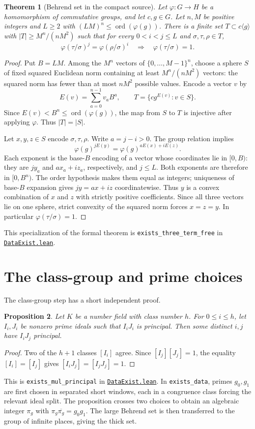 \documentclass[11pt,oneside,openany]{amsbook}
\newtheorem{theorem}{Theorem}[section]
\newtheorem{proposition}[theorem]{Proposition}
\theoremstyle{remark}
\numberwithin{equation}{section}
\newcommand{\ghroot}{https://github.com/lsernau/grh-lean/blob/}
\newcommand{\ghrev}{72fead102f663d5c7a407964a13dc0cf9d977207}
\newcommand{\leanfile}[2]{%
  \href{\ghroot\ghrev/grh-compact/src/#1}{\nolinkurl{#2}}}
\begin{document}
\begin{theorem}[Behrend set in the compact source]
\label{thm:behrend}
Let $\varphi:G\to H$ be a homomorphism of commutative
groups, and let $c,g\in G$. Let $n,M$ be positive
integers and $L\ge2$ with
$(LM)^n\le\operatorname{ord}(\varphi(g))$.
There is a finite set $T\subset c\langle g\rangle$ with
$|T|\ge M^n/(nM^2)$ such that for every
$0<i<j\le L$ and $\sigma,\tau,\rho\in T$,
\[
\varphi(\tau/\sigma)^j
 =\varphi(\rho/\sigma)^i
 \quad\Longrightarrow\quad
\varphi(\tau/\sigma)=1.
\]
\end{theorem}
\begin{proof}
Put $B=LM$. Among the $M^n$ vectors of
$\{0,\ldots,M-1\}^n$, choose a sphere $S$ of fixed
squared Euclidean norm containing at least
$M^n/(nM^2)$ vectors: the squared norm has fewer than
at most $nM^2$ possible values. Encode a vector $v$ by
\[
E(v)=\sum_{a=0}^{n-1}v_aB^a,
\qquad T=\{c g^{E(v)}:v\in S\}.
\]
Since $E(v)<B^n\le\operatorname{ord}(\varphi(g))$,
the map from $S$ to $T$ is injective after applying
$\varphi$. Thus $|T|=|S|$.

Let $x,y,z\in S$ encode $\sigma,\tau,\rho$.
Write $a=j-i>0$. The group relation implies
\[
\varphi(g)^{jE(y)}
 =\varphi(g)^{aE(x)+iE(z)}.
\]
Each exponent is the base-$B$ encoding of a vector
whose coordinates lie in $[0,B)$: they are $jy_a$ and
$ax_a+iz_a$, respectively, and $j\le L$. Both
exponents are therefore in $[0,B^n)$.
The order hypothesis makes them equal as integers;
uniqueness of base-$B$ expansion gives
$j y=a x+i z$ coordinatewise. Thus $y$ is a convex
combination of $x$ and $z$ with strictly positive
coefficients. Since all three vectors lie on one sphere,
strict convexity of the squared norm forces $x=z=y$.
In particular $\varphi(\tau/\sigma)=1$.
\end{proof}
This specialization of the formal theorem is
\texttt{exists\_three\_term\_free}
in \leanfile{New/Data/DataExist.lean}{DataExist.lean}.

\section{The class-group and prime choices}
\label{sec:class-group-data}
The class-group step has a short independent proof.
\begin{proposition}
\label{prop:class-pigeonhole}
Let $K$ be a number field with class number $h$.
For $0\le i\le h$, let $I_i,J_i$ be nonzero prime ideals
such that $I_iJ_i$ is principal. Then some distinct
$i,j$ have $I_iJ_j$ principal.
\end{proposition}
\begin{proof}
Two of the $h+1$ classes $[I_i]$ agree. Since
$[I_j][J_j]=1$, the equality $[I_i]=[I_j]$ gives
$[I_iJ_j]=[I_jJ_j]=1$.
\end{proof}
This is \texttt{exists\_mul\_principal} in
\leanfile{New/Data/DataExist.lean}{DataExist.lean}.
In \texttt{exists\_data}, primes $g_0,g_1$ are first
chosen in separated short windows, each in a congruence
class forcing the relevant ideal split. The proposition
crosses two choices to obtain an algebraic integer
$\pi_g$ with $\pi_g\overline{\pi_g}=g_0g_1$.
The large Behrend set is then transferred to the group
of infinite places, giving the thick set.
\end{document}

